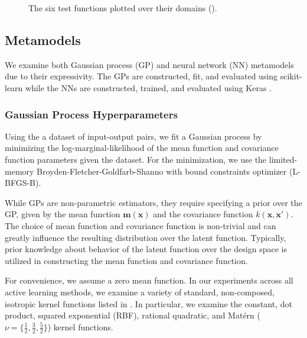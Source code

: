\documentclass[conference]{IEEEtran}
\begin{document}
	\begin{figure*}[htbp]
	    \centering
	    
	    \caption{The six test functions plotted over their domains ().}
	    \label{fig:test_fns}
	\end{figure*}
	
	\subsection{Metamodels}
	
	We examine both Gaussian process (GP) and neural network (NN) metamodels due to their expressivity. The GPs are constructed, fit, and evaluated using scikit-learn \cite{Scikit-learn:Python} while the NNs are constructed, trained, and evaluated using Keras \cite{Keras:API}.
	
	\subsubsection{Gaussian Process Hyperparameters}
	
	Using the a dataset of input-output pairs, we fit a Gaussian process by minimizing the log-marginal-likelihood of the mean function and covariance function parameters given the dataset. For the minimization, we use the limited-memory Broyden-Fletcher-Goldfarb-Shanno with bound constraints optimizer (\textsc{L-BFGS-B}).
	
	While GPs are non-parametric estimators, they require specifying a prior over the GP, given by the mean function $\boldsymbol{m}(\boldsymbol{x})$ and the covariance function $k(\boldsymbol{x}, \boldsymbol{x}')$. The choice of mean function and covariance function is non-trivial and can greatly influence the resulting distribution over the latent function. Typically, prior knowledge about behavior of the latent function over the design space is utilized in constructing the mean function and covariance function.
	
	For convenience, we assume a zero mean function. In our experiments across all active learning methods, we examine a variety of standard, non-composed, isotropic kernel functions listed in . In particular, we examine the constant, dot product, squared exponential (RBF), rational quadratic, and Mat\'ern ($\nu = \{\tfrac{1}{2}, \tfrac{3}{2}, \tfrac{5}{2}\}$) kernel functions. 
	
\end{document}
